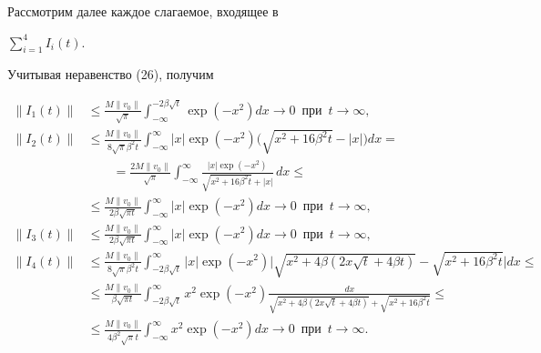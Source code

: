 Рассмотрим далее каждое слагаемое, входящее в


$\sum\limits_{i=1}^{4}I_{i}(t)$.


Учитывая неравенство (26), получим


\begin{align*}


\| I_1(t)\| &\leq \frac{M\| v_0\|}{\sqrt{\pi}}


\int_{-\infty}^{-2\beta\sqrt{t}}


\exp (-x^2 ) dx \to 0\ \; \text{при}\ \; t\to \infty,\\


%


\| I_2(t)\| &\leq \frac{M\| v_0\|}{8\sqrt{\pi}


\beta^2t} \int_{-\infty}^{\infty}


| x | \exp (-x^2 )\big (\sqrt{x^2+16\beta^2 t}-


| x | \big ) dx= \\


%


&\qquad =\frac{2M\| v_0\|}{\sqrt{\pi}}


\int_{-\infty}^{\infty}


\frac{| x |\exp(-x^2)}{\sqrt{x^2+16\beta^2 t}+| x |}\, dx \leq \\


%


&\leq\frac{M\| v_0\|}{2\beta\sqrt{\pi t}}


\int_{-\infty}^{\infty}| x | \exp (-x^2 )


dx \to 0\ \; \text{при}\ \; t\to \infty,\\


%


\| I_3(t)\| &\leq \frac{M\| v_0\|}


{2\beta \sqrt{\pi t}} \int_{-\infty}^{\infty}


| x | \exp (-x^2 )dx \to 0\ \; \text{при}\ \; t\to \infty,\\


%


\| I_4(t)\| &\leq \frac{M\| v_0\|}{8\sqrt{\pi}


\beta^2t} \int_{-2\beta\sqrt{t}}^{\infty}


| x | \exp(-x^2)\big| \sqrt{x^2+4\beta


(2x\sqrt{t}+4\beta t ) }- \sqrt{x^2+16\beta^2 t}\big| dx\leq\\


%


&\leq\frac{M\| v_0\|}{\beta \sqrt{\pi t} }


\int_{-2\beta\sqrt{t}}^{\infty} x^2


\exp (-x^2) \frac{dx}{\sqrt{x^2+4\beta


(2x\sqrt{t}+4\beta t )}+\sqrt{x^2+16\beta^2 t}} \leq\\


%


&\leq\frac{M\| v_0\|}{4\beta^2\sqrt{\pi} t}


\int_{-\infty}^{\infty} x^2 \exp(-x^2 )


dx \to 0\ \; \text{при}\ \; t\to \infty.


\end{align*}

